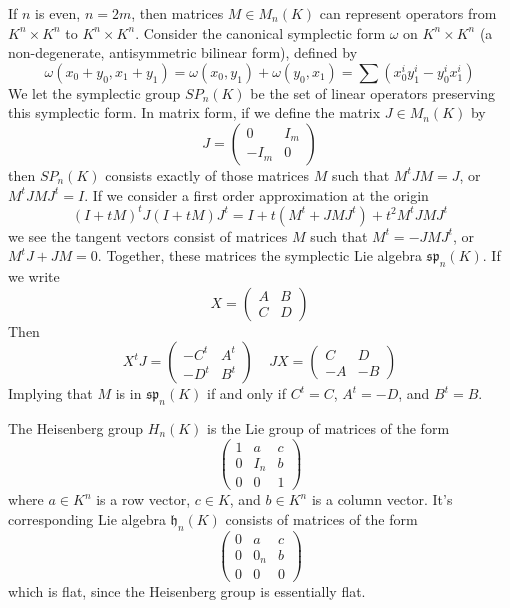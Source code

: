 \begin{example}
    If $n$ is even, $n = 2m$, then matrices $M \in M_n(K)$ can represent operators from $K^n \times K^n$ to $K^n \times K^n$. Consider the canonical symplectic form $\omega$ on $K^n \times K^n$ (a non-degenerate, antisymmetric bilinear form), defined by
    \[ \omega(x_0 + y_0, x_1 + y_1) = \omega(x_0,y_1) + \omega(y_0,x_1) = \sum (x_0^i y_1^i - y_0^i x_1^i) \]
    We let the symplectic group $SP_n(K)$ be the set of linear operators preserving this symplectic form. In matrix form, if we define the matrix $J \in M_n(K)$ by
    \[ J = \begin{pmatrix} 0 & I_m \\ -I_m & 0 \end{pmatrix} \]
    then $SP_n(K)$ consists exactly of those matrices $M$ such that $M^tJM = J$, or $M^tJMJ^t = I$. If we consider a first order approximation at the origin
    \[ (I + tM)^tJ(I + tM)J^t = I + t(M^t + JMJ^t) + t^2M^tJMJ^t \]
    we see the tangent vectors consist of matrices $M$ such that $M^t = -JMJ^t$, or $M^tJ + JM = 0$. Together, these matrices the symplectic Lie algebra $\mathfrak{sp}_n(K)$. If we write
    \[ X = \begin{pmatrix} A & B \\ C & D \end{pmatrix} \]
    Then
    \[ X^tJ = \begin{pmatrix} -C^t & A^t \\ -D^t & B^t \end{pmatrix}\ \ \ \ \ JX = \begin{pmatrix} C & D \\ -A & -B \end{pmatrix} \]
    Implying that $M$ is in $\mathfrak{sp}_n(K)$ if and only if $C^t = C$, $A^t= -D$, and $B^t = B$.
\end{example}

\begin{example}
    The Heisenberg group $H_n(K)$ is the Lie group of matrices of the form
    \[ \begin{pmatrix} 1 & a & c \\ 0 & I_n & b \\ 0 & 0 & 1 \end{pmatrix} \]
    where $a \in K^n$ is a row vector, $c \in K$, and $b \in K^n$ is a column vector. It's corresponding Lie algebra $\mathfrak{h}_n(K)$ consists of matrices of the form
    \[ \begin{pmatrix} 0 & a & c \\ 0 & 0_n & b \\ 0 & 0 & 0 \end{pmatrix} \]
    which is flat, since the Heisenberg group is essentially flat.
\end{example}


